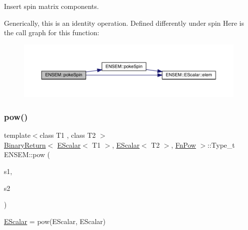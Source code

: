 Insert spin matrix components. 

Generically, this is an identity operation. Defined differently under spin Here is the call graph for this function\+:
\nopagebreak
\begin{figure}[H]
\begin{center}
\leavevmode
\includegraphics[width=350pt]{d4/dca/group__escalar_ga7f41ec60f3cfb7ed2f965af5b8a81132_cgraph}
\end{center}
\end{figure}
\mbox{\label{group__escalar_gaa3f8d5129f1ded089d42af89bd94827d}} 
\subsubsection{\texorpdfstring{pow()}{pow()}\hspace{0.1cm}{\footnotesize\ttfamily [1/2]}}
{\footnotesize\ttfamily template$<$class T1 , class T2 $>$ \\
\mbox{\hyperlink{structENSEM_1_1BinaryReturn}{Binary\+Return}}$<$ \mbox{\hyperlink{classENSEM_1_1EScalar}{E\+Scalar}}$<$ T1 $>$, \mbox{\hyperlink{classENSEM_1_1EScalar}{E\+Scalar}}$<$ T2 $>$, \mbox{\hyperlink{structENSEM_1_1FnPow}{Fn\+Pow}} $>$\+::Type\+\_\+t E\+N\+S\+E\+M\+::pow (\begin{DoxyParamCaption}\item[{const \mbox{\hyperlink{classENSEM_1_1EScalar}{E\+Scalar}}$<$ T1 $>$ \&}]{s1,  }\item[{const \mbox{\hyperlink{classENSEM_1_1EScalar}{E\+Scalar}}$<$ T2 $>$ \&}]{s2 }\end{DoxyParamCaption})\hspace{0.3cm}{\ttfamily [inline]}}



\mbox{\hyperlink{classENSEM_1_1EScalar}{E\+Scalar}} = pow(\+E\+Scalar, E\+Scalar) 

